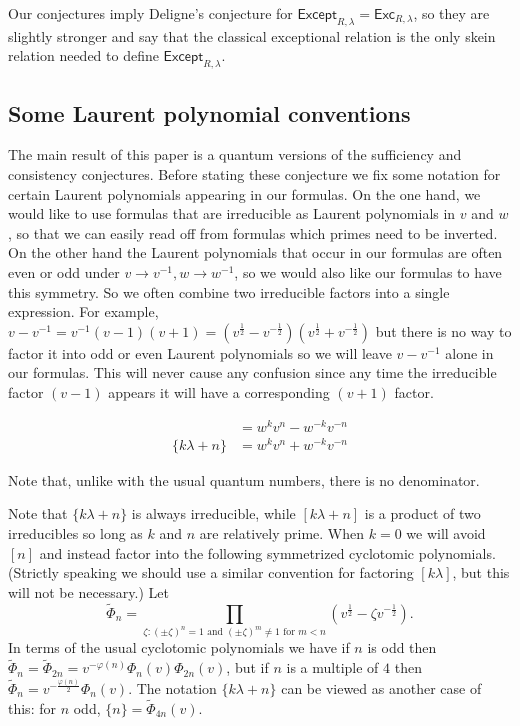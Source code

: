 \documentclass[12pt]{amsart}
\begin{document}
Our conjectures imply Deligne's conjecture for $\mathsf{Except}_{R,\lambda} = \mathsf{Exc}_{R,\lambda}$, so they are slightly stronger and say that the classical exceptional relation is the only skein relation needed to define $\mathsf{Except}_{R,\lambda}$.

\subsection{Some Laurent polynomial conventions}

The main result of this paper is a quantum versions of the sufficiency and consistency conjectures.  
Before stating these conjecture we fix some notation for certain Laurent polynomials appearing in our formulas.  On the one hand, we would like to use formulas that are irreducible as Laurent polynomials in $v$ and $w$, so that we can easily read off from formulas which primes need to be inverted.  On the other hand the Laurent polynomials that occur in our formulas are often even or odd under $v \rightarrow v^{-1}, w \rightarrow w^{-1}$, so we would also like our formulas to have this symmetry.  So we often combine two irreducible factors into a single expression.  For example, $v-v^{-1} = v^{-1}(v-1)(v+1) = (v^{\frac{1}{2}}-v^{-\frac{1}{2}})(v^{\frac{1}{2}}+v^{-\frac{1}{2}})$ but there is no way to factor it into odd or even Laurent polynomials so we will leave $v-v^{-1}$ alone in our formulas.  This will never cause any confusion since any time the irreducible factor $(v-1)$ appears it will have a corresponding $(v+1)$ factor.

\begin{align*}
[k\lambda + n] &= w^kv^n - w^{-k}v^{-n}\\
\{k\lambda + n\} &= w^k v^n + w^{-k} v^{-n}
\end{align*}

\begin{warning}
Note that, unlike with the usual quantum numbers, there is no denominator.
\end{warning}

Note that $\{k\lambda + n\}$ is always irreducible, while $[k\lambda +
n]$ is a product of two irreducibles so long as $k$ and $n$ are
relatively prime.  When
$k=0$ we will avoid $[n]$ and instead factor into the following
symmetrized cyclotomic polynomials.  (Strictly speaking we should use
a similar convention for factoring $[k \lambda]$, but this will not be
necessary.)  Let
\[
  \widetilde{\Phi}_n = \prod_{\zeta: (\pm \zeta)^n = 1 \text{ and } (\pm \zeta)^m \neq 1 \text{ for $m < n$}}
  (v^{\frac{1}{2}}-\zeta v^{-\frac{1}{2}}).
\]
In terms of the usual cyclotomic polynomials we have if $n$ is odd
then $\widetilde{\Phi}_n = \widetilde{\Phi}_{2n} = v^{-\varphi(n)}
\Phi_n(v) \Phi_{2n}(v)$, but if $n$ is a multiple of $4$ then
$\widetilde{\Phi}_n = v^{-\frac{\varphi(n)}{2}} \Phi_n(v)$.
The notation $\{k\lambda + n\}$ can be viewed as another case of this:
for $n$ odd,
$\{n\} = \widetilde{\Phi}_{4n}(v)$.
\end{document}
